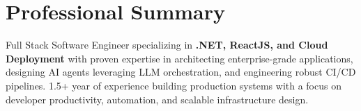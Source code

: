 \section{Professional Summary}
Full Stack Software Engineer specializing in \textbf{.NET, ReactJS, and Cloud Deployment} with proven expertise in architecting enterprise-grade applications, designing AI agents leveraging LLM orchestration, and engineering robust CI/CD pipelines. 1.5+ year of experience building production systems with a focus on developer productivity, automation, and scalable infrastructure design.
